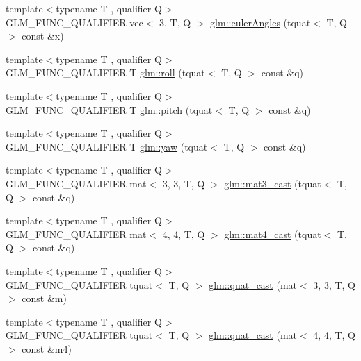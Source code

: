 \begin{DoxyCompactItemize}
{\footnotesize template$<$typename T , qualifier Q$>$ }\\G\+L\+M\+\_\+\+F\+U\+N\+C\+\_\+\+Q\+U\+A\+L\+I\+F\+I\+ER vec$<$ 3, T, Q $>$ \hyperlink{group__gtc__quaternion_gaf21424fa62e03de8b11c2b776c17d7a3}{glm\+::euler\+Angles} (tquat$<$ T, Q $>$ const \&x)
\item 
{\footnotesize template$<$typename T , qualifier Q$>$ }\\G\+L\+M\+\_\+\+F\+U\+N\+C\+\_\+\+Q\+U\+A\+L\+I\+F\+I\+ER T \hyperlink{group__gtc__quaternion_ga3ff93afbd9cc29f2ad217f2228e8a95b}{glm\+::roll} (tquat$<$ T, Q $>$ const \&q)
\item 
{\footnotesize template$<$typename T , qualifier Q$>$ }\\G\+L\+M\+\_\+\+F\+U\+N\+C\+\_\+\+Q\+U\+A\+L\+I\+F\+I\+ER T \hyperlink{group__gtc__quaternion_ga9bd78e5fe153d07e39fb4c83e73dba73}{glm\+::pitch} (tquat$<$ T, Q $>$ const \&q)
\item 
{\footnotesize template$<$typename T , qualifier Q$>$ }\\G\+L\+M\+\_\+\+F\+U\+N\+C\+\_\+\+Q\+U\+A\+L\+I\+F\+I\+ER T \hyperlink{group__gtc__quaternion_ga53feffeb4001b99e36e216522e465e9e}{glm\+::yaw} (tquat$<$ T, Q $>$ const \&q)
\item 
{\footnotesize template$<$typename T , qualifier Q$>$ }\\G\+L\+M\+\_\+\+F\+U\+N\+C\+\_\+\+Q\+U\+A\+L\+I\+F\+I\+ER mat$<$ 3, 3, T, Q $>$ \hyperlink{group__gtc__quaternion_ga6e88f15c94effe737c876d21ea0db101}{glm\+::mat3\+\_\+cast} (tquat$<$ T, Q $>$ const \&q)
\item 
{\footnotesize template$<$typename T , qualifier Q$>$ }\\G\+L\+M\+\_\+\+F\+U\+N\+C\+\_\+\+Q\+U\+A\+L\+I\+F\+I\+ER mat$<$ 4, 4, T, Q $>$ \hyperlink{group__gtc__quaternion_ga8e2085f17cd5aae423c04536524f11b3}{glm\+::mat4\+\_\+cast} (tquat$<$ T, Q $>$ const \&q)
\item 
{\footnotesize template$<$typename T , qualifier Q$>$ }\\G\+L\+M\+\_\+\+F\+U\+N\+C\+\_\+\+Q\+U\+A\+L\+I\+F\+I\+ER tquat$<$ T, Q $>$ \hyperlink{group__gtc__quaternion_ga03e023aec9acd561a28594bbc8a3abf6}{glm\+::quat\+\_\+cast} (mat$<$ 3, 3, T, Q $>$ const \&m)
\item 
{\footnotesize template$<$typename T , qualifier Q$>$ }\\G\+L\+M\+\_\+\+F\+U\+N\+C\+\_\+\+Q\+U\+A\+L\+I\+F\+I\+ER tquat$<$ T, Q $>$ \hyperlink{group__gtc__quaternion_ga50bb9aecf42fdab04e16039ab6a81c60}{glm\+::quat\+\_\+cast} (mat$<$ 4, 4, T, Q $>$ const \&m4)

\end{DoxyCompactItemize}
